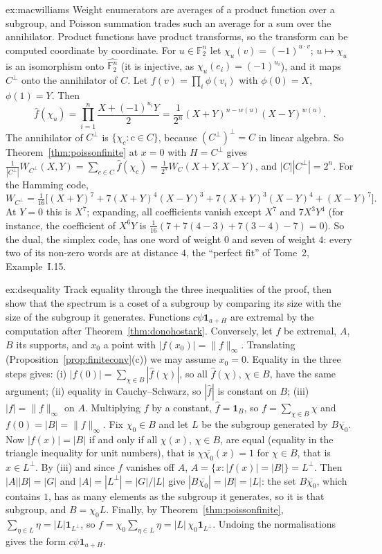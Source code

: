 \begin{solution}{ex:macwilliams}
\idea Weight enumerators are averages of a product function over a subgroup, and Poisson summation trades such an average for a
sum over the annihilator. Product functions have product transforms, so the transform can be computed coordinate by coordinate.
\writeup For $u\in\mathbb F_2^n$ let $\chi_u(v)=(-1)^{u\cdot v}$; $u\mapsto\chi_u$ is an isomorphism onto $\widehat{\mathbb F_2^n}$ (it is injective, as $\chi_u(e_i)=(-1)^{u_i}$), and it maps
$C^\perp$ onto the annihilator of $C$. Let $f(v)=\prod_i\phi(v_i)$ with $\phi(0)=X$, $\phi(1)=Y$. Then
\[\hat f(\chi_u)=\prod_{i=1}^n\frac{X+(-1)^{u_i}Y}2=\frac1{2^n}(X+Y)^{n-w(u)}(X-Y)^{w(u)}.\]
The annihilator of $C^\perp$ is $\{\chi_c:c\in C\}$, because $(C^\perp)^\perp=C$ in linear algebra. So Theorem~\ref{thm:poissonfinite} at $x=0$ with $H=C^\perp$ gives
$\frac1{|C^\perp|}W_{C^\perp}(X,Y)=\sum_{c\in C}\hat f(\chi_c)=\frac1{2^n}W_C(X+Y,X-Y)$, and $|C||C^\perp|=2^n$. For the Hamming code,
\[W_{C^\perp}=\tfrac1{16}\bigl[(X+Y)^7+7(X+Y)^4(X-Y)^3+7(X+Y)^3(X-Y)^4+(X-Y)^7\bigr].\]
At $Y=0$ this is $X^7$; expanding, all coefficients vanish except $X^7$ and $7X^3Y^4$ (for instance, the coefficient of $X^6Y$ is
$\frac1{16}(7+7(4-3)+7(3-4)-7)=0$). So the dual, the simplex code, has one word of weight $0$ and seven of weight $4$: every two of its
non-zero words are at distance $4$, the ``perfect fit'' of Tome~2, Example~I.15.
\end{solution}

\begin{solution}{ex:dsequality}
\idea Track equality through the three inequalities of the proof, then show that the spectrum is a coset of a subgroup by comparing
its size with the size of the subgroup it generates.
\writeup Functions $c\psi\mathbf 1_{a+H}$ are extremal by the computation after Theorem~\ref{thm:donohostark}. Conversely, let $f$ be extremal, $A$, $B$ its supports,
and $x_0$ a point with $|f(x_0)|=\|f\|_\infty$. Translating (Proposition~\ref{prop:finiteconv}(c)) we may assume $x_0=0$. Equality in the three steps gives: (i)
$|f(0)|=\sum_{\chi\in B}|\hat f(\chi)|$, so all $\hat f(\chi)$, $\chi\in B$, have the same argument; (ii) equality in Cauchy--Schwarz, so $|\hat f|$ is constant on
$B$; (iii) $|f|=\|f\|_\infty$ on $A$. Multiplying $f$ by a constant, $\hat f=\mathbf 1_B$, so $f=\sum_{\chi\in B}\chi$ and $f(0)=|B|=\|f\|_\infty$. Fix $\chi_0\in B$ and let $L$ be the
subgroup generated by $B\overline{\chi_0}$. Now $|f(x)|=|B|$ if and only if all $\chi(x)$, $\chi\in B$, are equal (equality in the triangle inequality for unit
numbers), that is $\chi\overline{\chi_0}(x)=1$ for $\chi\in B$, that is $x\in L^\perp$. By (iii) and since $f$ vanishes off $A$, $A=\{x:|f(x)|=|B|\}=L^\perp$. Then
$|A||B|=|G|$ and $|A|=|L^\perp|=|G|/|L|$ give $|B\overline{\chi_0}|=|B|=|L|$: the set $B\overline{\chi_0}$, which contains $1$, has as many elements as the subgroup it
generates, so it is that subgroup, and $B=\chi_0L$. Finally, by Theorem~\ref{thm:poissonfinite}, $\sum_{\eta\in L}\eta=|L|\mathbf 1_{L^\perp}$, so
$f=\chi_0\sum_{\eta\in L}\eta=|L|\,\chi_0\mathbf 1_{L^\perp}$. Undoing the normalisations gives the form $c\psi\mathbf 1_{a+H}$.
\end{solution}

